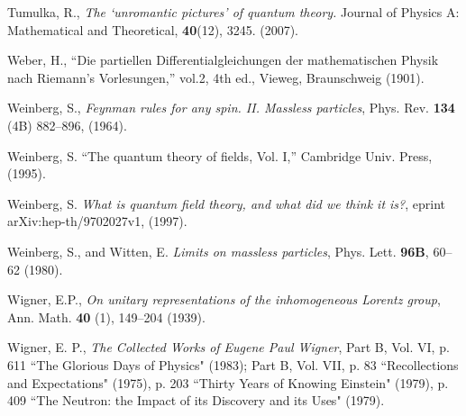 \documentclass[12pt]{article}
\theoremstyle{definition}
\numberwithin{equation}{section}
\begin{document}
\begin{thebibliography}{[KTZ2020]}
Tumulka, R.,
\textit{The ‘unromantic pictures’ of quantum theory.}
 Journal of Physics A: Mathematical and Theoretical, \textbf{40}(12), 3245. (2007).\vspace{-4pt}

  Weber, H.,
  ``{Die partiellen Differentialgleichungen der mathematischen Physik nach Riemann's Vorlesungen},''
  vol.2, 4th ed., Vieweg, Braunschweig (1901).\vspace{-4pt}

Weinberg, S.,
\textit{Feynman rules for any spin. II.  Massless particles},
Phys. Rev. \textbf{134} (4B) 882--896, (1964).

  Weinberg, S.
  ``The quantum theory of fields, Vol. I,''
  Cambridge Univ. Press, (1995).%

  Weinberg, S.
  \textit{What is quantum field theory, and what did we think it is?},
  eprint arXiv:hep-th/9702027v1, (1997).\vspace{-4pt}

  Weinberg, S.,
  and
  Witten, E.
  \textit{Limits on massless particles},
  {Phys. Lett.} \textbf{96B}, 60--62 (1980).\vspace{-4pt}

     Wigner, E.P.,
     \textit{On unitary representations of the inhomogeneous Lorentz group},
     Ann. Math. \textbf{40} (1), 149--204 (1939).\vspace{-4pt}

Wigner, E. P.,
\textit{The Collected Works of Eugene Paul Wigner}, Part B, Vol. VI, p. 611 ``The Glorious Days of Physics" (1983); 
Part B, Vol. VII, p. 83  ``Recollections and Expectations" (1975), p. 203 ``Thirty Years of Knowing Einstein" (1979), 
p. 409 ``The Neutron: the Impact of its Discovery and its Uses" (1979).

\end{thebibliography}
\end{document}
